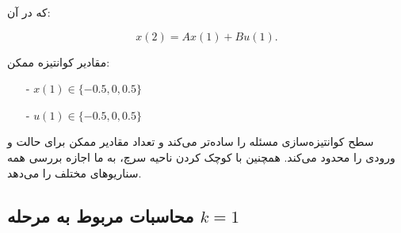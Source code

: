 \documentclass[14pt, a4paper]{extarticle}
\begin{document}
	که در آن:
	
	\[
	x(2) = A x(1) + B u(1).
	\]
	
	مقادیر کوانتیزه ممکن:
	\begin{itemize}
		\item[-] \( x(1) \in \{-0.5, 0, 0.5\} \)
		\item[-] \( u(1) \in \{-0.5, 0, 0.5\} \)
	\end{itemize}
	
	سطح کوانتیزه‌سازی مسئله را ساده‌تر می‌کند و تعداد مقادیر ممکن برای حالت و ورودی را محدود می‌کند. همچنین با کوچک کردن ناحیه سرچ، به ما اجازه بررسی همه سناریوهای مختلف را می‌دهد.
	
	\subsection*{محاسبات مربوط به مرحله \( k = 1 \)}
\end{document}
